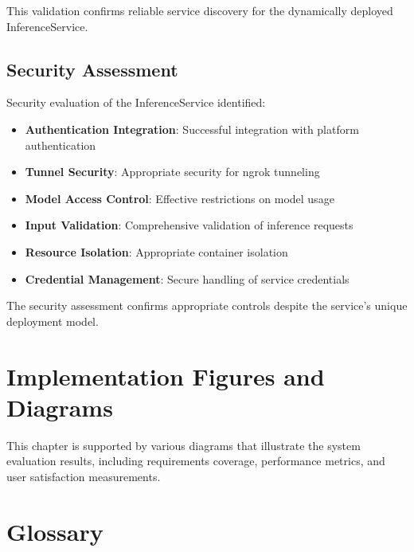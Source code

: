 This validation confirms reliable service discovery for the dynamically deployed InferenceService.

\subsection{Security Assessment}

Security evaluation of the InferenceService identified:

\begin{itemize}
    \item \textbf{Authentication Integration}: Successful integration with platform authentication
    \item \textbf{Tunnel Security}: Appropriate security for ngrok tunneling
    \item \textbf{Model Access Control}: Effective restrictions on model usage
    \item \textbf{Input Validation}: Comprehensive validation of inference requests
    \item \textbf{Resource Isolation}: Appropriate container isolation
    \item \textbf{Credential Management}: Secure handling of service credentials
\end{itemize}

The security assessment confirms appropriate controls despite the service's unique deployment model.

\section{Implementation Figures and Diagrams}

This chapter is supported by various diagrams that illustrate the system evaluation results, including requirements coverage, performance metrics, and user satisfaction measurements.


\section{Glossary}

